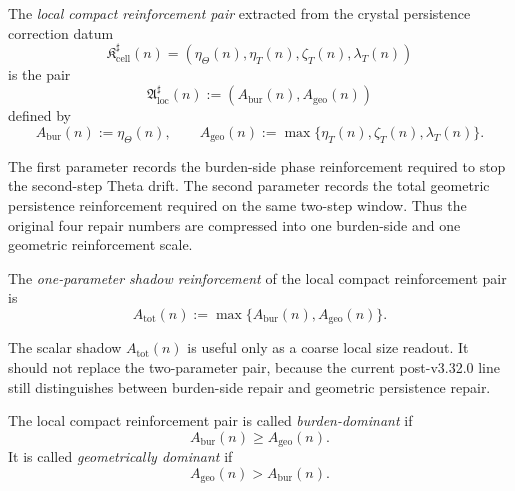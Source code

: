 \begin{definition}
\label{def:local-compact-reinforcement-pair}
The \emph{local compact reinforcement pair} extracted from the crystal persistence correction datum
\[
  \mathfrak K_{\mathrm{cell}}^{\sharp}(n)
  =
  (\eta_{\Theta}(n),\eta_T(n),\zeta_T(n),\lambda_T(n))
\]
is the pair
\[
  \mathfrak A_{\mathrm{loc}}^{\sharp}(n)
  :=
  (A_{\mathrm{bur}}(n),A_{\mathrm{geo}}(n))
\]
defined by
\[
  A_{\mathrm{bur}}(n):=\eta_{\Theta}(n),
  \qquad
  A_{\mathrm{geo}}(n):=\max\{\eta_T(n),\zeta_T(n),\lambda_T(n)\}.
\]
\end{definition}

\begin{remark}
\label{rem:meaning-of-the-compact-pair}
The first parameter records the burden-side phase reinforcement required to stop the second-step Theta drift.
The second parameter records the total geometric persistence reinforcement required on the same two-step window.
Thus the original four repair numbers are compressed into one burden-side and one geometric reinforcement scale.
\end{remark}

\begin{definition}
\label{def:one-parameter-shadow-reinforcement}
The \emph{one-parameter shadow reinforcement} of the local compact reinforcement pair is
\[
  A_{\mathrm{tot}}(n)
  :=
  \max\{A_{\mathrm{bur}}(n),A_{\mathrm{geo}}(n)\}.
\]
\end{definition}

\begin{remark}
\label{rem:why-the-one-parameter-shadow-is-secondary}
The scalar shadow $A_{\mathrm{tot}}(n)$ is useful only as a coarse local size readout.
It should not replace the two-parameter pair, because the current post-v3.32.0 line still distinguishes between burden-side repair and geometric persistence repair.
\end{remark}

\begin{definition}
\label{def:burden-dominant-compact-reinforcement}
The local compact reinforcement pair is called \emph{burden-dominant} if
\[
  A_{\mathrm{bur}}(n)\ge A_{\mathrm{geo}}(n).
\]
It is called \emph{geometrically dominant} if
\[
  A_{\mathrm{geo}}(n)>A_{\mathrm{bur}}(n).
\]
\end{definition}


